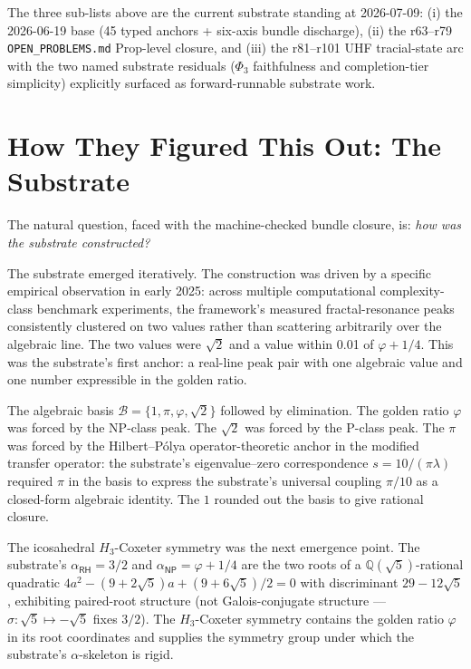 \documentclass[11pt,a4paper]{amsart}
\theoremstyle{plain}
\theoremstyle{definition}
\begin{document}
The three sub-lists above are the current substrate standing at 2026-07-09: (i) the 2026-06-19 base (45 typed anchors + six-axis bundle discharge), (ii) the r63--r79 \texttt{OPEN\_PROBLEMS.md} Prop-level closure, and (iii) the r81--r101 UHF tracial-state arc with the two named substrate residuals ($\Phi_3$ faithfulness and completion-tier simplicity) explicitly surfaced as forward-runnable substrate work.

\section{How They Figured This Out: The Substrate}\label{sec:how}

The natural question, faced with the machine-checked bundle closure, is: \emph{how was the substrate constructed?}

The substrate emerged iteratively. The construction was driven by a specific empirical observation in early 2025: across multiple computational complexity-class benchmark experiments, the framework's measured fractal-resonance peaks consistently clustered on two values rather than scattering arbitrarily over the algebraic line. The two values were $\sqrt{2}$ and a value within 0.01 of $\varphi+1/4$. This was the substrate's first anchor: a real-line peak pair with one algebraic value and one number expressible in the golden ratio.

The algebraic basis $\mathcal{B}=\{1,\pi,\varphi,\sqrt{2}\}$ followed by elimination. The golden ratio $\varphi$ was forced by the NP-class peak. The $\sqrt{2}$ was forced by the P-class peak. The $\pi$ was forced by the Hilbert--P\'olya operator-theoretic anchor in the modified transfer operator: the substrate's eigenvalue--zero correspondence $s = 10/(\pi\lambda)$ required $\pi$ in the basis to express the substrate's universal coupling $\pi/10$ as a closed-form algebraic identity. The $1$ rounded out the basis to give rational closure.

The icosahedral $H_3$-Coxeter symmetry was the next emergence point. The substrate's $\alpha_{\textsf{RH}} = 3/2$ and $\alpha_{\textsf{NP}} = \varphi + 1/4$ are the two roots of a $\mathbb{Q}(\sqrt{5})$-rational quadratic $4a^2 - (9+2\sqrt{5})a + (9+6\sqrt{5})/2 = 0$ with discriminant $29-12\sqrt{5}$, exhibiting paired-root structure (not Galois-conjugate structure --- $\sigma:\sqrt{5}\mapsto-\sqrt{5}$ fixes $3/2$). The $H_3$-Coxeter symmetry contains the golden ratio $\varphi$ in its root coordinates and supplies the symmetry group under which the substrate's $\alpha$-skeleton is rigid.
\end{document}
